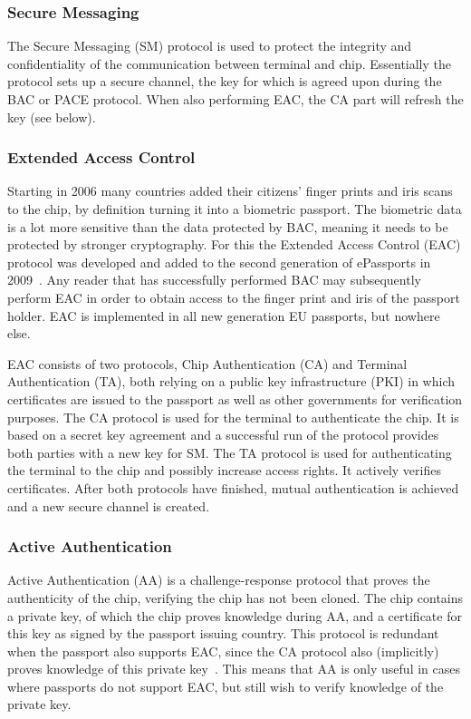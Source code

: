 \subsubsection{Secure Messaging}
The Secure Messaging (SM) protocol is used to protect the integrity and confidentiality of the communication between terminal and chip. Essentially the protocol sets up a secure channel, the key for which is agreed upon during the BAC or PACE protocol. When also performing EAC, the CA part will refresh the key (see below).

\subsubsection{Extended Access Control}
Starting in 2006 many countries added their citizens' finger prints and iris scans to the chip, by definition turning it into a biometric passport. The biometric data is a lot more sensitive than the data protected by BAC, meaning it needs to be protected by stronger cryptography. For this the Extended Access Control (EAC) protocol was developed and added to the second generation of ePassports in 2009~\cite{gemalto}. Any reader that has successfully performed BAC may subsequently perform EAC in order to obtain access to the finger print and iris of the passport holder. EAC is implemented in all new generation EU passports, but nowhere else.

EAC consists of two protocols, Chip Authentication (CA) and Terminal Authentication (TA), both relying on a public key infrastructure (PKI) in which certificates are issued to the passport as well as other governments for verification purposes. The CA protocol is used for the terminal to authenticate the chip. It is based on a secret key agreement and a successful run of the protocol provides both parties with a new key for SM. The TA protocol is used for authenticating the terminal to the chip and possibly increase access rights. It actively verifies certificates. After both protocols have finished, mutual authentication is achieved and a new secure channel is created.

\subsubsection{Active Authentication}
Active Authentication (AA) is a challenge-response protocol that proves the authenticity of the chip, verifying the chip has not been cloned. The chip contains a private key, of which the chip proves knowledge during AA, and a certificate for this key as signed by the passport issuing country. This protocol is redundant when the passport also supports EAC, since the CA protocol also (implicitly) proves knowledge of this private key~\cite{secprivepassport}. This means that AA is only useful in cases where passports do not support EAC, but still wish to verify knowledge of the private key.

